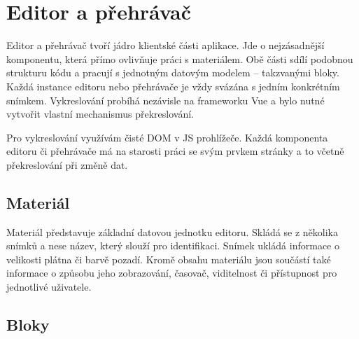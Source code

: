 



\section{Editor a přehrávač}\label{text:realizace/editor}

Editor a přehrávač tvoří jádro klientské části aplikace. 
Jde o nejzásadnější komponentu, která přímo ovlivňuje práci s materiálem. 
Obě části sdílí podobnou strukturu kódu a pracují s jednotným datovým modelem -- takzvanými bloky. 
Každá instance editoru nebo přehrávače je vždy svázána s jedním konkrétním snímkem. 
Vykreslování probíhá nezávisle na frameworku Vue a bylo nutné vytvořit vlastní mechanismus překreslování.

Pro vykreslování využívám čisté DOM v JS prohlížeče.
Každá komponenta editoru či přehrávače má na starosti práci se svým prvkem stránky a to včetně překreslování při změně dat.

\subsection{Materiál}

Materiál představuje základní datovou jednotku editoru.
Skládá se z několika snímků a nese název, který slouží pro identifikaci. 
Snímek ukládá informace o velikosti plátna či barvě pozadí.
Kromě obsahu materiálu jsou součástí také informace o způsobu jeho zobrazování, časovač, viditelnost či přístupnost pro jednotlivé uživatele.

\subsection{Bloky}

